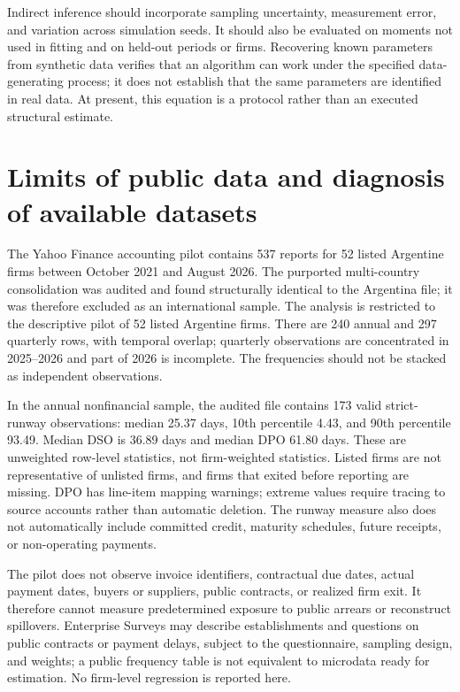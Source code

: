 \documentclass[11pt,a4paper]{article}
\begin{document}
Indirect inference should incorporate sampling uncertainty, measurement error, and variation across simulation seeds. It should also be evaluated on moments not used in fitting and on held-out periods or firms. Recovering known parameters from synthetic data verifies that an algorithm can work under the specified data-generating process; it does not establish that the same parameters are identified in real data. At present, this equation is a protocol rather than an executed structural estimate.

\section{Limits of public data and diagnosis of available datasets}
The Yahoo Finance accounting pilot contains 537 reports for 52 listed Argentine firms between October 2021 and August 2026. The purported multi-country consolidation was audited and found structurally identical to the Argentina file; it was therefore excluded as an international sample. The analysis is restricted to the descriptive pilot of 52 listed Argentine firms. There are 240 annual and 297 quarterly rows, with temporal overlap; quarterly observations are concentrated in 2025--2026 and part of 2026 is incomplete. The frequencies should not be stacked as independent observations.

In the annual nonfinancial sample, the audited file contains 173 valid strict-runway observations: median 25.37 days, 10th percentile 4.43, and 90th percentile 93.49. Median DSO is 36.89 days and median DPO 61.80 days. These are unweighted row-level statistics, not firm-weighted statistics. Listed firms are not representative of unlisted firms, and firms that exited before reporting are missing. DPO has line-item mapping warnings; extreme values require tracing to source accounts rather than automatic deletion. The runway measure also does not automatically include committed credit, maturity schedules, future receipts, or non-operating payments.

The pilot does not observe invoice identifiers, contractual due dates, actual payment dates, buyers or suppliers, public contracts, or realized firm exit. It therefore cannot measure predetermined exposure to public arrears or reconstruct spillovers. Enterprise Surveys may describe establishments and questions on public contracts or payment delays, subject to the questionnaire, sampling design, and weights; a public frequency table is not equivalent to microdata ready for estimation. No firm-level regression is reported here.
\end{document}
